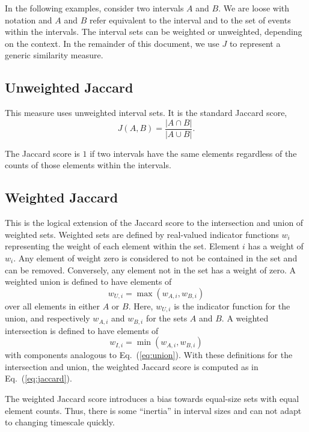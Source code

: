 \documentclass[draft]{article}
\begin{document}
In the following examples, consider two intervals $A$ and $B$.  We are
loose with notation and $A$ and $B$ refer equivalent to the interval
and to the set of events within the intervals.  The interval sets can
be weighted or unweighted, depending on the context.  In the remainder
of this document, we use $J$ to represent a generic similarity measure.

\subsection{Unweighted Jaccard}
This measure uses unweighted interval sets.  It is the standard
Jaccard score,
\begin{equation}
  \label{eq:jaccard}
  J(A,B) = \frac{|A \cap B|}{|A \cup B|}.
\end{equation}

The Jaccard score is $1$ if two intervals have the same elements
regardless of the counts of those elements within the intervals.

\subsection{Weighted Jaccard}
This is the logical extension of the Jaccard score to the intersection
and union of weighted sets.  Weighted sets are defined by real-valued
indicator functions $w_{i}$ representing the weight of each element within
the set.  Element $i$ has a weight of $w_i$.  Any element of weight
zero is considered to not be contained in
the set and can be removed.  Conversely, any element not in the set
has a weight of zero.
A weighted union is defined to have elements of
\begin{equation}
  \label{eq:union}
  w_{U,i} = \max(w_{A,i}, w_{B,i})
\end{equation}
over all elements in either $A$ or $B$.  Here, $w_{U,i}$ is the
indicator function for the union, and respectively $w_{A,i}$ and
$w_{B,i}$ for the sets $A$ and $B$.  A weighted intersection is
defined to have elements of
\begin{equation}
  w_{I,i} = \min(w_{A,i}, w_{B,i})
\end{equation}
with components analogous to Eq.~(\ref{eq:union}).  With these
definitions for the intersection and union, the weighted Jaccard score
is computed as in Eq.~(\ref{eq:jaccard}).

The weighted Jaccard score introduces a bias towards equal-size sets
with equal element counts.  Thus, there is some ``inertia'' in
interval sizes and can not adapt to changing timescale quickly.
\end{document}

